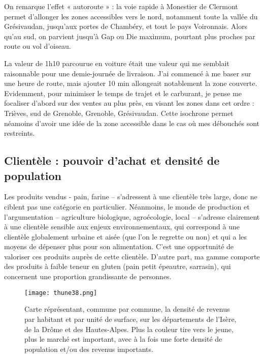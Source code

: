 \documentclass{book}
\begin{document}
On remarque l’effet « autoroute » : la voie rapide à Monestier de Clermont permet d’allonger les zones accessibles vers le nord, notamment toute la vallée du Grésivaudan, jusqu’aux portes de Chambéry, et tout le pays Voironnais. Alors qu’au sud, on parvient jusqu’à Gap ou Die maximum, pourtant plus proches par route ou vol d’oiseau. 

La valeur de 1h10 parcourue en voiture était une valeur qui me semblait raisonnable pour une demie-journée de livraison. J’ai commencé à me baser sur une heure de route, mais ajouter 10 min allongeait notablement la zone couverte. Evidemment, pour minimiser le temps de trajet et le carburant, je pense me focaliser d’abord sur des ventes au plus près, en visant les zones dans cet ordre : Trièves, sud de Grenoble, Grenoble, Grésivaudan. Cette isochrone permet néamoins d'avoir une idée de la zone accessible dans le cas où mes débouchés sont restreints. 

\subsection{Clientèle : pouvoir d'achat et densité de population}

Les produits vendus - pain, farine – s’adressent à une clientèle très large, donc ne ciblent pas une catégorie en particulier. Néanmoins, le monde de production et l’argumentation – agriculture biologique, agroécologie, local – s’adresse clairement à une clientèle sensible aux enjeux environnementaux, qui correspond à une clientèle globalement urbaine et aisée (que l’on le regrette ou non) et qui a les moyens de dépenser plus pour son alimentation. C’est une opportunité de valoriser ces produits auprès de cette clientèle. D’autre part, ma gamme comporte des produits à faible teneur en gluten (pain petit épeautre, sarrasin), qui concernent une proportion grandissante de personnes.

\begin{figure}[h!]
\begin{center}
	\texttt{[image: thune38.png]}
	\caption{Carte réprésentant, commune par commune, la densité de revenus par habitant et par unité de surface, sur les départements de l'Isère, de la Drôme et des Hautes-Alpes. Plus la couleur tire vers le jeune, plus le marché est important, avec à la fois une forte densité de population et/ou des revenus importants.}
	\label{fig:thune38}
\end{center}
\end{figure}
\end{document}
